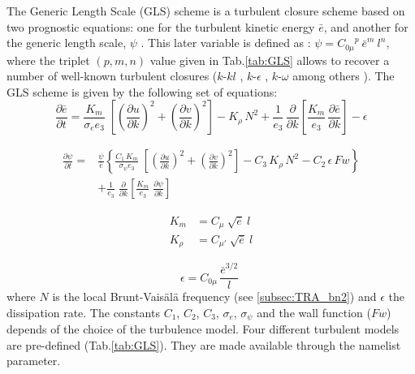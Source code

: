 \documentclass[../tex_main/NEMO_manual]{subfiles}
\begin{document}
The Generic Length Scale (GLS) scheme is a turbulent closure scheme based on 
two prognostic equations: one for the turbulent kinetic energy $\bar {e}$, and another 
for the generic length scale, $\psi$ \citep{Umlauf_Burchard_JMS03, Umlauf_Burchard_CSR05}. 
This later variable is defined as : $\psi = {C_{0\mu}}^{p} \ {\bar{e}}^{m} \ l^{n}$, 
where the triplet $(p, m, n)$ value given in Tab.\autoref{tab:GLS} allows to recover 
a number of well-known turbulent closures ($k$-$kl$ \citep{Mellor_Yamada_1982}, 
$k$-$\epsilon$ \citep{Rodi_1987}, $k$-$\omega$ \citep{Wilcox_1988} 
among others \citep{Umlauf_Burchard_JMS03,Kantha_Carniel_CSR05}). 
The GLS scheme is given by the following set of equations:
\begin{equation} \label{eq:zdfgls_e}
\frac{\partial \bar{e}}{\partial t} = 
\frac{K_m}{\sigma_e e_3 }\;\left[ {\left( \frac{\partial u}{\partial k} \right)^2
                                                   +\left( \frac{\partial v}{\partial k} \right)^2} \right]
-K_\rho \,N^2
+\frac{1}{e_3}\,\frac{\partial}{\partial k} \left[ \frac{K_m}{e_3}\,\frac{\partial \bar{e}}{\partial k} \right]
- \epsilon
\end{equation}

\begin{equation} \label{eq:zdfgls_psi}
   \begin{split}
\frac{\partial \psi}{\partial t} =& \frac{\psi}{\bar{e}} \left\{
\frac{C_1\,K_m}{\sigma_{\psi} {e_3}}\;\left[ {\left( \frac{\partial u}{\partial k} \right)^2
                                                                   +\left( \frac{\partial v}{\partial k} \right)^2} \right]
- C_3 \,K_\rho\,N^2   - C_2 \,\epsilon \,Fw   \right\}             \\
&+\frac{1}{e_3}  \;\frac{\partial }{\partial k}\left[ {\frac{K_m}{e_3 }
                                  \;\frac{\partial \psi}{\partial k}} \right]\;
   \end{split}
\end{equation}

\begin{equation} \label{eq:zdfgls_kz}
   \begin{split}
         K_m    &= C_{\mu} \ \sqrt {\bar{e}} \ l         \\
         K_\rho &= C_{\mu'}\ \sqrt {\bar{e}} \ l
   \end{split}
\end{equation}

\begin{equation} \label{eq:zdfgls_eps}
{\epsilon} = C_{0\mu} \,\frac{\bar {e}^{3/2}}{l} \;
\end{equation}
where $N$ is the local Brunt-Vais\"{a}l\"{a} frequency (see \autoref{subsec:TRA_bn2}) 
and $\epsilon$ the dissipation rate. 
The constants $C_1$, $C_2$, $C_3$, ${\sigma_e}$, ${\sigma_{\psi}}$ and the wall function ($Fw$) 
depends of the choice of the turbulence model. Four different turbulent models are pre-defined 
(Tab.\autoref{tab:GLS}). They are made available through the  namelist parameter. 
\end{document}
